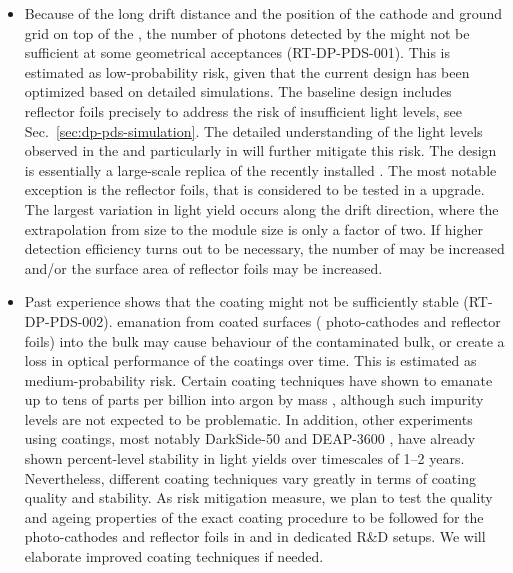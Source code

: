 \begin{itemize}

\item Because of the long drift distance and the position of the cathode and ground grid on top of the , the number of photons detected by the  might not be sufficient at some geometrical acceptances (RT-DP-PDS-001). This is estimated as low-probability risk, given that the current  design has been optimized based on detailed simulations. The  baseline design includes  reflector foils precisely to address the risk of insufficient light levels, see Sec.~\ref{sec:dp-pds-simulation}. The detailed understanding of the light levels observed in the  and particularly in  will further mitigate this risk. The \dune {}  design is essentially a large-scale replica of the recently installed  . The most notable exception is the  reflector foils, that is considered to be tested in a   upgrade. The largest variation in light yield occurs along the drift direction, where the extrapolation from  size to the \dune {} module size is only a factor of two. If higher  detection efficiency turns out to be necessary, the number of  may be increased and/or the surface area of  reflector foils may be increased.

\item Past experience shows that the  coating might not be sufficiently stable (RT-DP-PDS-002).  emanation from coated surfaces ( photo-cathodes and  reflector foils) into the bulk  may cause  behaviour of the contaminated  bulk, or create a loss in optical performance of the coatings over time. This is estimated as medium-probability risk. Certain coating techniques have shown to emanate  up to tens of parts per billion into argon by mass \cite{Asaadi:2018ixs}, although such impurity levels are not expected to be problematic. In addition, other  experiments using  coatings, most notably DarkSide-50 \cite{Agnes:2018fwg} and DEAP-3600 \cite{Ajaj:2019imk}, have already shown percent-level stability in  light yields over timescales of 1--2 years. Nevertheless, different coating techniques vary greatly in terms of coating quality and stability. As risk mitigation measure, we plan to test the quality and ageing properties of the exact coating procedure to be followed for the  photo-cathodes and  reflector foils in  and in dedicated R\&D setups. We will elaborate improved coating techniques if needed.


\end{itemize}
